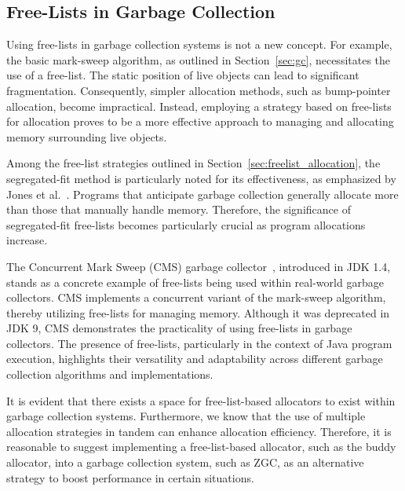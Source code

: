 \subsection{Free-Lists in Garbage Collection}

Using free-lists in garbage collection systems is not a new concept. For example, the basic mark-sweep algorithm, as outlined in Section~\ref{sec:gc}, necessitates the use of a free-list. The static position of live objects can lead to significant fragmentation. Consequently, simpler allocation methods, such as bump-pointer allocation, become impractical. Instead, employing a strategy based on free-lists for allocation proves to be a more effective approach to managing and allocating memory surrounding live objects.

Among the free-list strategies outlined in Section~\ref{sec:freelist_allocation}, the segregated-fit method is particularly noted for its effectiveness, as emphasized by Jones et al.~\cite{gchandbook}. Programs that anticipate garbage collection generally allocate more than those that manually handle memory. Therefore, the significance of segregated-fit free-lists becomes particularly crucial as program allocations increase.

The Concurrent Mark Sweep (CMS) garbage collector~\cite{cms}, introduced in JDK 1.4, stands as a concrete example of free-lists being used within real-world garbage collectors. CMS implements a concurrent variant of the mark-sweep algorithm, thereby utilizing free-lists for managing memory. Although it was deprecated in JDK 9, CMS demonstrates the practicality of using free-lists in garbage collectors. The presence of free-lists, particularly in the context of Java program execution, highlights their versatility and adaptability across different garbage collection algorithms and implementations.

It is evident that there exists a space for free-list-based allocators to exist within garbage collection systems. Furthermore, we know that the use of multiple allocation strategies in tandem can enhance allocation efficiency. Therefore, it is reasonable to suggest implementing a free-list-based allocator, such as the buddy allocator, into a garbage collection system, such as ZGC, as an alternative strategy to boost performance in certain situations.


